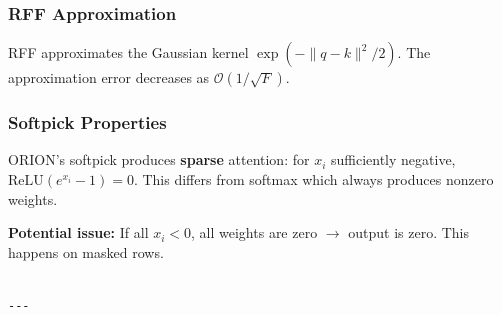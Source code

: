 \subsubsection{RFF Approximation}

RFF approximates the Gaussian kernel $\exp(-\|q - k\|^2 / 2)$. The 
approximation error decreases as $\mathcal{O}(1/\sqrt{F})$.

\subsubsection{Softpick Properties}

ORION's softpick produces \textbf{sparse} attention: for $x_i$ sufficiently 
negative, $\text{ReLU}(e^{x_i} - 1) = 0$. This differs from softmax which 
always produces nonzero weights.

\textbf{Potential issue:} If all $x_i < 0$, all weights are zero $\to$ output is 
zero. This happens on masked rows.
\begin{lstlisting}

---
\end{lstlisting}